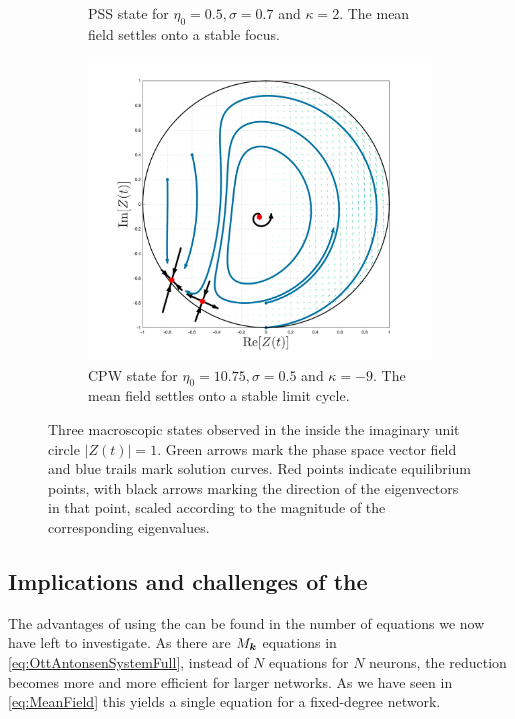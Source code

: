 \begin{figure}[H]
\begin{subfigure}[b]{0.32\linewidth}
   \caption{PSS state for $\eta_0 = 0.5, \sigma = 0.7$ and $\kappa= 2$. The mean field settles onto a stable focus.}
   \label{fig:MFRPSS}
\end{subfigure} \hfill
\begin{subfigure}[b]{0.32\linewidth}
   \centering
  \includegraphics[width=\linewidth, trim={2cm 1cm 2cm 1.5cm },clip]{../Figures/PhaseSpace/MFRCPW.png}
   \caption{CPW state for $\eta_0 = 10.75, \sigma = 0.5$ and $\kappa= -9$. The mean field settles onto a stable limit cycle.}
   \label{fig:MFRCPW}
\end{subfigure}
   \caption{Three macroscopic states observed in the \MFR inside the imaginary unit circle $|Z(t)| = 1$. Green arrows mark the phase space vector field and blue trails mark solution curves. Red points indicate equilibrium points, with black arrows marking the direction of the eigenvectors in that point, scaled according to the magnitude of the corresponding eigenvalues.}
   \label{fig:macroscopicstatesfixeddegree}
\end{figure}


\subsection{Implications and challenges of the \MFR}
The advantages of using the \MFR can be found in the number of equations we now have left to investigate. As there are $M_{{\boldsymbol{k}}}$ equations in \eqref{eq:OttAntonsenSystemFull}, instead of $N$ equations for $N$ neurons, the reduction becomes more and more efficient for larger networks. As we have seen in \eqref{eq:MeanField} this yields a single equation for a fixed-degree network.\\

